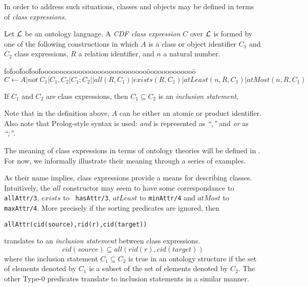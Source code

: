 In order to address such situations, classes and objects may be
defined in terms of {\em class expressions}.

\begin{definition} \label{def:ce} 
Let ${\cal L}$ be an ontology language.  A {\em CDF class expression} $C$
over ${\cal L}$ is formed by one of the following constructions in which
$A$ is a class or object identifier $C_1$ and $C_2$ class expressions,
$R$ a relation identifier, and $n$ a natural number.
\begin{tabbing}
fo\=foo\=foo\=foo\=foooooooooooooooooooooooooooo\=ooooooooooooo\=\kill
\> $C \leftarrow A | not\ C_1 | C_1 , C_2 | C_1 ; C_2 |
			| all(R,C_1) | exists(R,C_1)
 			  | atLeast(n,R,C_1) | atMost(n,R,C_1)  $ 
\end{tabbing}
If $C_1$ and $C_2$ are class expressions, then $C_1 \subseteq C_2$ is
an {\em inclusion statement},  
\end{definition}
Note that in the definition above, $A$ can be either an atomic or
product identifier. Also note that Prolog-style syntax is used: {\em
and} is represented as {\em ``,''} and {\em or} as {\em ``;''}.  

The meaning of class expressions in terms of ontology theories will be
defined in .  For now, we informally
illustrate their meaning through a series of examples.

As their name implies, class expressions provide a means for
describing classes.  Intuitively, the $all$ constructor may seem to
have some correspondance to {\tt allAttr/3}, $exists$ to {\tt
hasAttr/3}, $atLeast$ to {\tt minAttr/4} and $atMost$ to {\tt
maxAttr/4}.  More precisely if the sorting predicates are ignored,
then
\begin{center}
{\tt allAttr(cid(source),rid(r),cid(target))} 
\end{center}
\noindent
translates to an {\em inclusion statement} 
 between class expressions.
\[ 
cid(source) \subseteq all(rid(r),cid(target))
\]
where the inclusion statement $C_1 \subseteq C_2$ is true in an
ontology structure if the set of elements denoted by $C_1$ is a subset
of the set of elements denoted by $C_2$.  The other Type-0 predicates
translate to inclusion statements in a similar manner.

